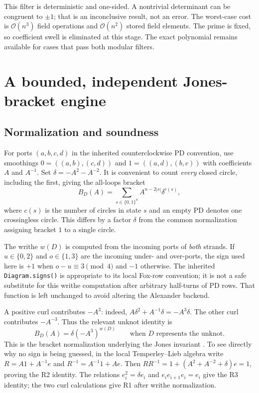 \documentclass[11pt]{article}
\theoremstyle{remark}\newtheorem{remark}[theorem]{Remark}
\newcommand{\OO}{\mathcal O}
\newcommand{\code}[1]{\texttt{\small #1}}
\begin{document}
This filter is deterministic and one-sided. A nontrivial determinant can
be congruent to $\pm1$; that is an inconclusive result, not an error. The
worst-case cost is $\OO(n^3)$ field operations and $\OO(n^2)$ stored field
elements. The prime is fixed, so coefficient swell is eliminated at this
stage. The exact polynomial remains available for cases that pass both
modular filters.

\section{A bounded, independent Jones-bracket engine}
\label{sec:jones}

\subsection{Normalization and soundness}

For ports $(a,b,c,d)$ in the inherited counterclockwise PD convention, use
smoothings $0=((a,b),(c,d))$ and $1=((a,d),(b,c))$ with coefficients $A$ and
$A^{-1}$. Set $\delta=-A^2-A^{-2}$. It is convenient to count \emph{every}
closed circle, including the first, giving the all-loops bracket
\begin{equation}\label{eq:bracket}
 B_D(A)=\sum_{s\in\{0,1\}^n} A^{n-2|s|}\delta^{c(s)},
\end{equation}
where $c(s)$ is the number of circles in state $s$ and an empty PD denotes
one crossingless circle. This differs by a factor $\delta$ from the common
normalization assigning bracket $1$ to a single circle.

The writhe $w(D)$ is computed from the incoming ports of \emph{both} strands.
If $u\in\{0,2\}$ and $o\in\{1,3\}$ are the incoming under- and over-ports,
the sign used here is $+1$ when $o-u\equiv3\pmod4$ and $-1$ otherwise.
The inherited \code{Diagram.signs()} is appropriate to its local Fox-row
convention; it is not a safe substitute for this writhe computation after
arbitrary half-turns of PD rows. That function is left unchanged to avoid
altering the Alexander backend.

A positive curl contributes $-A^3$: indeed,
$A\delta^2+A^{-1}\delta=-A^3\delta$. The other curl contributes $-A^{-3}$.
Thus the relevant unknot identity is
\begin{equation}\label{eq:unknot-bracket}
 B_D(A)=\delta(-A^3)^{w(D)}\qquad\text{when }D\text{ represents the unknot}.
\end{equation}
This is the bracket normalization underlying the Jones invariant
\cite{kauffman}. To see directly why no sign is being guessed, in the local
Temperley--Lieb algebra write $R=A1+A^{-1}e$ and
$R^{-1}=A^{-1}1+Ae$. Then
$RR^{-1}=1+(A^2+A^{-2}+\delta)e=1$, proving the R2 identity. The relations
$e_i^2=\delta e_i$ and $e_i e_{i+1}e_i=e_i$ give the R3 identity; the two
curl calculations give R1 after writhe normalization.
\end{document}
